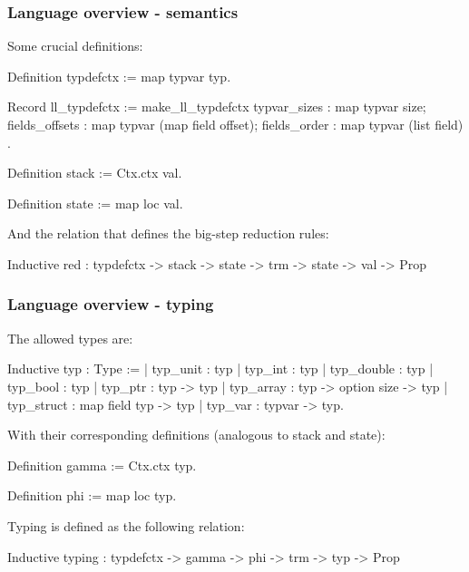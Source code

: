 \begin{frame}[fragile]
\frametitle{Language overview - semantics}

Some crucial definitions:

\begin{coqs}
  Definition typdefctx := map typvar typ.

  Record ll_typdefctx := make_ll_typdefctx {
    typvar_sizes				: map typvar size;
    fields_offsets	: map typvar (map field offset);
    fields_order				: map typvar (list field) }.

  Definition stack := Ctx.ctx val.

  Definition state := map loc val.
\end{coqs}

\bigskip \pause

And the relation that defines the big-step reduction rules:

\begin{coqs}
  Inductive red : typdefctx -> stack -> state -> trm -> state -> val -> Prop
\end{coqs}


\end{frame}


\begin{frame}[fragile]
\frametitle{Language overview - typing}

The allowed types are:

\begin{coqs}
  Inductive typ : Type :=
    | typ_unit : typ
    | typ_int : typ
    | typ_double : typ
    | typ_bool : typ
    | typ_ptr : typ -> typ
    | typ_array : typ -> option size -> typ
    | typ_struct : map field typ -> typ
    | typ_var : typvar -> typ.
\end{coqs}

\bigskip \pause

With their corresponding definitions (analogous to stack and state):

\begin{coqs}
  Definition gamma := Ctx.ctx typ.

  Definition phi := map loc typ.
\end{coqs}

\bigskip \pause

Typing is defined as the following relation:

\begin{coqs}
  Inductive typing : typdefctx -> gamma -> phi -> trm -> typ -> Prop
\end{coqs}


\end{frame}


